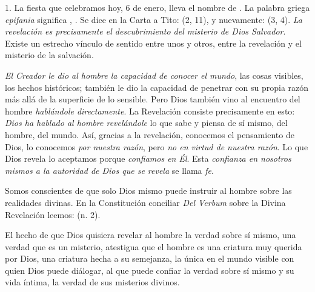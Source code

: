 				\begin{body}
					1. La fiesta que celebramos hoy, 6 de enero, lleva el nombre de . La palabra griega \emph{epifania} significa , . Se dice en la Carta a Tito:  (2, 11), y nuevamente:  (3, 4). \emph{La revelación es precisamente el descubrimiento del misterio de Dios Salvador}. Existe un estrecho vínculo de sentido entre unos y otros, entre la revelación y el misterio de la salvación.
					
					\emph{El Creador le dio al hombre la capacidad de conocer el mundo}, las cosas visibles, los hechos históricos; también le dio la capacidad de penetrar con su propia razón más allá de la superficie de lo sensible. Pero Dios también vino al encuentro del hombre \emph{hablándole directamente}. La Revelación consiste precisamente en esto: \emph{Dios ha hablado al hombre revelándole} lo que sabe y piensa de sí mismo, del hombre, del mundo. Así, gracias a la revelación, conocemos el pensamiento de Dios, lo conocemos \emph{por nuestra razón}, pero \emph{no en virtud de nuestra razón}. Lo que Dios revela lo aceptamos porque \emph{confiamos en Él}. Esta \emph{confianza en nosotros mismos a la autoridad de Dios que se revela} se llama \emph{fe}.
					
					Somos conscientes de que solo Dios mismo puede instruir al hombre sobre las realidades divinas. En la Constitución conciliar \emph{Del Verbum} sobre la Divina Revelación leemos:  (n. 2).
					
					El hecho de que Dios quisiera revelar al hombre la verdad sobre sí mismo, una verdad que es un misterio, atestigua que el hombre es una criatura muy querida por Dios, una criatura hecha a su semejanza, la única en el mundo visible con quien Dios puede diálogar, al que puede confiar la verdad sobre sí mismo y su vida íntima, la verdad de sus misterios divinos.
					

\end{body}
